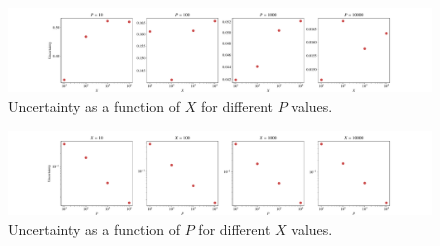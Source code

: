 \begin{figure}[htb]
	\centering
	\includegraphics[width=\linewidth]{figs/1.5_uncertainty_function_of_x.pdf}
	\caption{Uncertainty as a function of $X$ for different $P$ values.}
	\label{fig:uncertainty_function_of_x}
\end{figure}

\begin{figure}[htb]
	\centering
	\includegraphics[width=\linewidth]{figs/1.5_uncertainty_function_of_p.pdf}
	\caption{Uncertainty as a function of $P$ for different $X$ values.}
	\label{fig:uncertainty_function_of_p}
\end{figure}
